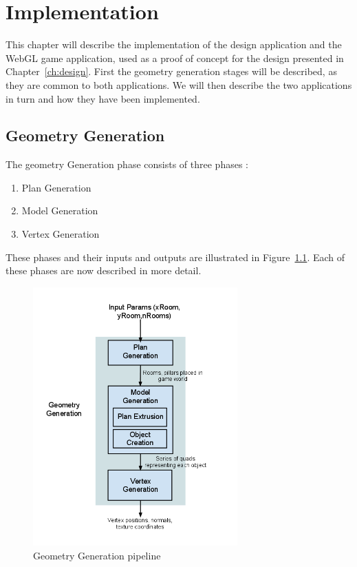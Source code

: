 \chapter{Implementation}
\label{ch:impl}
This chapter will describe the implementation of the design application and the WebGL game application, used as a proof of concept for the design presented in Chapter~\ref{ch:design}. 
First the geometry generation stages will be described, as they are common to both applications.
We will then describe the two applications in turn and how they have been implemented.

\section{Geometry Generation}
\label{sec:geomgen}
The geometry Generation phase consists of three phases : 
\begin{enumerate}
	\item Plan Generation
	\item Model Generation
	\item Vertex Generation
\end{enumerate}
These phases and their inputs and outputs are illustrated in Figure~\ref{fig:geomgen}.
Each of these phases are now described in more detail.

\begin{figure}
  \centering
  \includegraphics[width=0.7\textwidth]{images/geom_gen}
  \caption{Geometry Generation pipeline}
  \label{fig:geomgen}
\end{figure}

